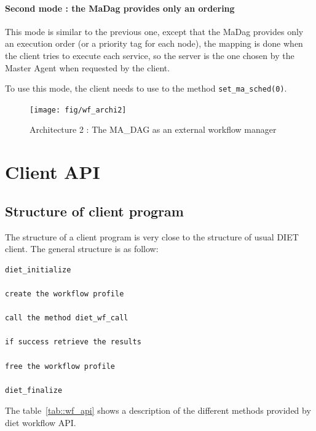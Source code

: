 \paragraph{Second mode : the MaDag provides only an ordering}

This mode is similar to the previous one, except that the MaDag
provides only an execution order (or a priority tag for each node),
the mapping is done when the client tries to execute each service, so
the server is the one chosen by the Master Agent when requested by the
client.

To use this mode, the client needs to use to the method
\texttt{set\_ma\dag\_sched(0)}. 

\begin{figure}[htbp]
  \centering
  \texttt{[image: fig/wf\_archi2]}
  \caption{Architecture 2 : The MA\_DAG as an external workflow manager}
  \label{fig:archi2}
\end{figure}




\section{Client API}


\subsection{Structure of client program}
\label{sec:client_prg}

The structure of a client program is very close to the structure of
usual DIET client. The general structure is as follow:

\begin{verbatim}
diet_initialize

create the workflow profile

call the method diet_wf_call

if success retrieve the results

free the workflow profile

diet_finalize
\end{verbatim}

The table~\ref{tab::wf_api} shows a description of the different
methods provided by diet workflow API. 

